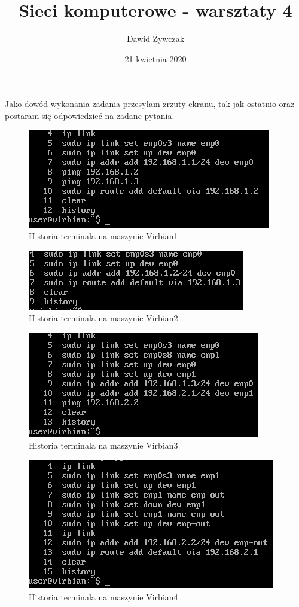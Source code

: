 \documentclass[a4paper]{scrartcl}
\title{Sieci komputerowe - warsztaty 4}
\author{Dawid Żywczak}
\date{21 kwietnia 2020}
\begin{document}
\maketitle
\qquad Jako dowód wykonania zadania przesyłam zrzuty ekranu, tak jak ostatnio oraz postaram się odpowiedzieć na zadane pytania.\\
\begin{figure}
  \includegraphics[width=\linewidth]{hist_1.png}
  \caption{Historia terminala na maszynie Virbian1}
\end{figure}
\begin{figure}
  \includegraphics[width=\linewidth]{hist_2.png}
  \caption{Historia terminala na maszynie Virbian2}
\end{figure}
\begin{figure}
  \includegraphics[width=\linewidth]{hist_3.png}
  \caption{Historia terminala na maszynie Virbian3}
\end{figure}
\begin{figure}
  \includegraphics[width=\linewidth]{hist_4.png}
  \caption{Historia terminala na maszynie Virbian4}
\end{figure}
\end{document}
